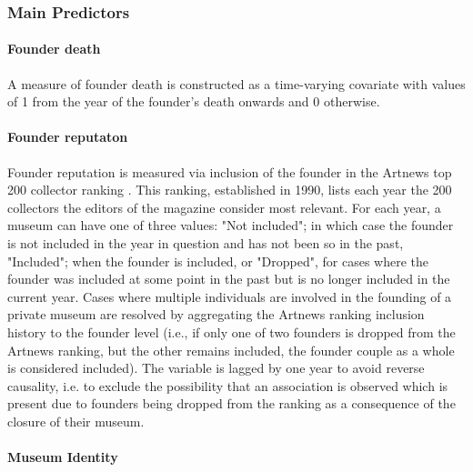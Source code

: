 \documentclass[12pt]{article}
\begin{document}
\subsubsection*{Main Predictors}


\paragraph*{Founder death}

A measure of founder death is constructed as a time-varying covariate with values of 1 from the year of the founder's death onwards and 0 otherwise.
\paragraph*{Founder reputaton}


Founder reputation is measured via inclusion of the founder in the Artnews top 200 collector ranking \parencite{Artnews_ranking}.
This ranking, established in 1990, lists each year the 200 collectors the editors of the magazine consider most relevant.
For each year, a museum can have one of three values: "Not included"; in which case the founder is not included in the year in question and has not been so in the past, "Included"; when the founder is included, or "Dropped", for cases where the founder was included at some point in the past but is no longer included in the current year.
Cases where multiple individuals are involved in the founding of a private museum are resolved by aggregating the Artnews ranking inclusion history to the founder level (i.e., if only one of two founders is dropped from the Artnews ranking, but the other remains included, the founder couple as a whole is considered included).
The variable is lagged by one year to avoid reverse causality, i.e. to exclude the possibility that an association is observed which is present due to founders being dropped from the ranking as a consequence of the closure of their museum.
\paragraph*{Museum Identity}
\end{document}
